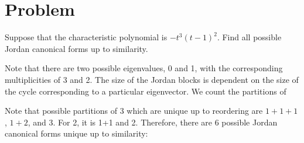 \documentclass[11pt]{scrartcl}
\begin{document}
\section{Problem}

\begin{problem*}
  Suppose that the characteristic polynomial is $-t^3(t-1)^2$. Find
  all possible Jordan canonical forms up to similarity.
\end{problem*}
\begin{soln}
  \hfill

  Note that there are two possible eigenvalues, 0 and 1, with the
  corresponding multiplicities of 3 and 2. The size of the Jordan
  blocks is dependent on the size of the cycle corresponding to a
  particular eigenvector. We count the partitions of             
  
  Note that possible partitions of 3 which are unique up to reordering
  are $1+1+1$, $1+2$, and $3$. For 2, it is 1+1 and 2. Therefore,
  there are 6 possible Jordan canonical forms unique up to similarity:


\end{soln}
\end{document}
